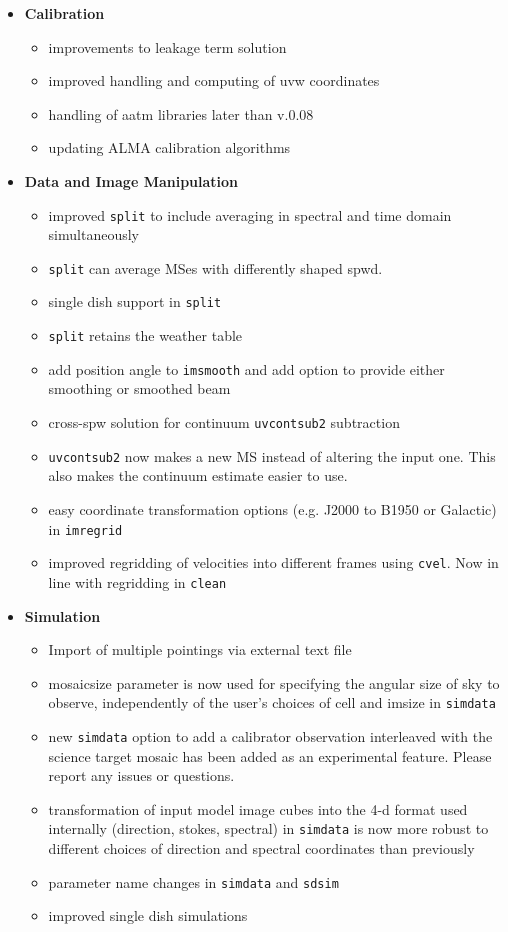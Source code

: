 \begin{itemize}
\item {\bf Calibration}
\begin{itemize}
 \item improvements to leakage term solution
   \item improved handling and computing of uvw coordinates
     \item handling of aatm libraries later than v.0.08
       \item updating ALMA calibration algorithms
\end{itemize}
  

\item {\bf Data and Image Manipulation}
  \begin{itemize}
  \item improved {\tt split} to include averaging in spectral and time
    domain simultaneously
   \item {\tt split} can average MSes with differently shaped spwd.
  \item single dish support in {\tt split} 
    \item {\tt split} retains the weather table
      \item add position angle to {\tt imsmooth} and add option to
        provide either smoothing or smoothed beam
        \item cross-spw solution for continuum {\tt uvcontsub2}
          subtraction
          \item {\tt uvcontsub2} now makes a new MS instead of altering the input one.  This
also makes the continuum estimate easier to use.
          \item easy coordinate transformation options (e.g. J2000 to
            B1950 or Galactic) in  {\tt imregrid} 
            \item improved regridding of velocities into different frames using
              {\tt cvel}. Now in line with regridding in {\tt clean}
   \end{itemize}

\item {\bf Simulation}
  \begin{itemize}
   \item Import of multiple pointings via external text file
   \item mosaicsize parameter is now used for specifying the angular
     size of sky to observe, independently of the user's choices of
     cell and imsize in {\tt simdata}
     \item new {\tt simdata} option to add a calibrator observation interleaved with the
science target mosaic has been added as an experimental feature. Please
report any issues or questions.
   \item transformation of input model image cubes into the 4-d format used
internally (direction, stokes, spectral) in {\tt simdata} is now more robust to different
choices of direction and spectral coordinates than previously
   \item parameter name changes in {\tt simdata} and {\tt sdsim}
     \item improved single dish simulations
    \end{itemize}


\end{itemize}
